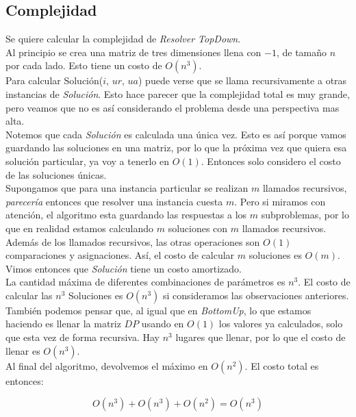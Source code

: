\subsection{Complejidad}

Se quiere calcular la complejidad de \textit{Resolver TopDown}. \\

Al principio se crea una matriz de tres dimensiones llena con $-1$, de tamaño $n$ por cada lado. Esto tiene un costo de $O(n^3)$. \\

Para calcular Solución($i$, $ur$, $ua$) puede verse que se llama recursivamente a otras instancias de \textit{Solución}. Esto hace parecer que la complejidad total es muy grande, pero veamos que no es así considerando el problema desde una perspectiva mas alta. \\

Notemos que cada \textit{Solución} es calculada una única vez. Esto es así porque vamos guardando las soluciones en una matriz, por lo que la próxima vez que quiera esa solución particular, ya voy a tenerlo en $O(1)$. Entonces solo considero el costo de las soluciones únicas. \\

Supongamos que para una instancia particular se realizan $m$ llamados recursivos, \textit{parecería} entonces que resolver una instancia cuesta $m$. Pero si miramos con atención, el algoritmo esta guardando las respuestas a los $m$ subproblemas, por lo que en realidad estamos calculando $m$ soluciones con $m$ llamados recursivos. Además de los llamados recursivos, las otras operaciones son $O(1)$ comparaciones y asignaciones. Así, el costo de calcular $m$ soluciones es $O(m)$. Vimos entonces que \textit{Solución} tiene un costo amortizado. \\

La cantidad máxima de diferentes combinaciones de parámetros es $n^3$. El costo de calcular las $n^3$ Soluciones es $O(n^3)$ si consideramos las observaciones anteriores.\\

También podemos pensar que, al igual que en \textit{BottomUp}, lo que estamos haciendo es llenar la matriz $DP$ usando en $O(1)$ los valores ya calculados, solo que esta vez de forma recursiva. Hay $n^3$ lugares que llenar, por lo que el costo de llenar es $O(n^3)$. \\


Al final del algoritmo, devolvemos el máximo en $O(n^2)$. El costo total es entonces:

$$O(n^3) + O(n^3) + O(n^2) = O(n^3)$$
